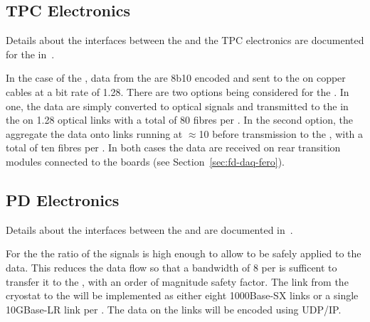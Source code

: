 
\subsection{TPC Electronics}
\label{sec:fd-daq-intfc-elec}

Details about the interfaces between the  and the TPC electronics
are documented for the  
in~\cite{docdb-6742}.

In the case of the , data from the  
 are 8b10 encoded and sent to the
 on copper cables at a bit rate of \SI{1.28}{\Gbps}. There
are two options being considered for the . In one, the
data are simply converted to optical signals and transmitted to the
 in the  on \SI{1.28}{\Gbps} optical links with a total of \num{80}
fibres per . In the second option, the  aggregate the
data onto links running at $\approx$\SI{10}{\Gbps} before transmission
to the , with a total of ten fibres per . In both cases the data
are received on rear transition modules connected to the 
 boards (see Section~\ref{sec:fd-daq-fero}).


\subsection{PD Electronics}
\label{sec:fd-daq-intfc-photon}

Details about the interfaces between the  and 
 are documented in~\cite{docdb-6727}.


For the   the  ratio of the
 signals is high enough to allow  to be safely
applied to the data. This reduces the data flow so that a bandwidth of
\SI{8}{\Gbps} per  is sufficent to transfer it to the ,
with an order of magnitude safety factor. The link from the 
cryostat to the  will be implemented as either eight 1000Base-SX
links or a single 10GBase-LR link per .
The data on the links will be encoded using UDP/IP.
